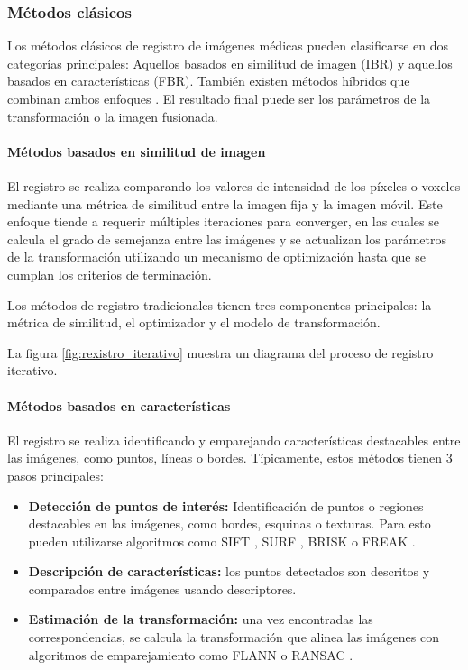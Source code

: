 \subsubsection{Métodos clásicos}\label{subsubsec:Métodos clásicos}

Los métodos clásicos de registro de imágenes médicas pueden clasificarse en dos categorías principales:
Aquellos basados en similitud de imagen (\gls{IBR}) y aquellos basados en características (\gls{FBR}).
También existen métodos híbridos que combinan ambos enfoques \cite{integrateintfeat}.
El resultado final puede ser los parámetros de la transformación o la imagen fusionada.

\paragraph{Métodos basados en similitud de imagen}
\label{par:Métodos basados en similitud de imagen}

El registro se realiza comparando los valores de intensidad de los píxeles o voxeles mediante una métrica de similitud entre la imagen fija y la imagen móvil.
Este enfoque tiende a requerir múltiples iteraciones para converger, en las cuales se calcula el grado de semejanza entre las imágenes y
se actualizan los parámetros de la transformación utilizando un mecanismo de optimización hasta que se cumplan los criterios de terminación.

Los métodos de registro tradicionales tienen tres componentes principales: la métrica de similitud, el optimizador y el modelo de transformación.

La figura \ref{fig:rexistro_iterativo} muestra un diagrama del proceso de registro iterativo.

\paragraph{Métodos basados en características}
\label{par:Métodos basados en características}

El registro se realiza identificando y emparejando características destacables entre las imágenes, como puntos, líneas o bordes.
Típicamente, estos métodos tienen 3 pasos principales:

\begin{itemize}
\item \textbf{Detección de puntos de interés:} Identificación de puntos o regiones destacables en las imágenes, como bordes, esquinas o texturas. Para esto pueden utilizarse algoritmos como SIFT \cite{sift}, SURF \cite{surf}, BRISK \cite{brisk} o FREAK \cite{freakkeypoint}.
\item \textbf{Descripción de características:} los puntos detectados son descritos y comparados entre imágenes usando descriptores.
\item \textbf{Estimación de la transformación:} una vez encontradas las correspondencias, se calcula la transformación que alinea las imágenes con algoritmos de emparejamiento como FLANN \cite{flann} o RANSAC \cite{ransac}.
\end{itemize}

